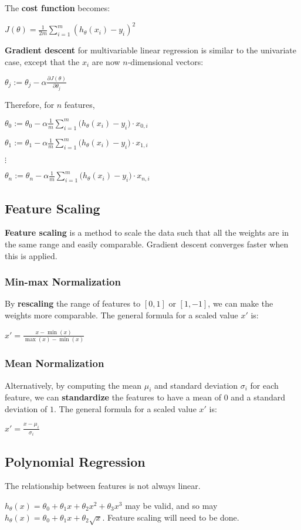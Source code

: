         The \textbf{cost function} becomes:

        $J(\theta) = \frac{1}{2m} \sum_{i=1}^m (h_\theta(x_i) - y_i)^2$

        \textbf{Gradient descent} for multivariable linear regression is similar to the univariate case, except that the $x_i$ are now $n$-dimensional vectors:

        $\theta_j := \theta_j - \alpha \frac{\partial J(\theta)}{\partial \theta_j}$

        Therefore, for $n$ features,

        $\theta_0 := \theta_0 - \alpha \frac{1}{m} \sum_{i=1}^m \big( h_\theta(x_i) - y_i \big) \cdot x_{0,i}$

        $\theta_1 := \theta_1 - \alpha \frac{1}{m} \sum_{i=1}^m \big( h_\theta(x_i) - y_i \big) \cdot x_{1,i}$

        $\vdots$

        $\theta_n := \theta_n - \alpha \frac{1}{m} \sum_{i=1}^m \big( h_\theta(x_i) - y_i \big) \cdot x_{n,i}$

    \subsection{Feature Scaling}
        \textbf{Feature scaling} is a method to scale the data such that all the weights are in the same range and easily comparable. Gradient descent converges faster when this is applied.

        \subsubsection{Min-max Normalization}
            By \textbf{rescaling} the range of features to $[0, 1]$ or $[1, -1]$, we can make the weights more comparable. The general formula for a scaled value $x'$ is:

            $x' = \frac{x - \min(x)}{\max(x) - \min(x)}$

        \subsubsection{Mean Normalization}
            Alternatively, by computing the mean $\mu_i$ and standard deviation $\sigma_i$ for each feature, we can \textbf{standardize} the features to have a mean of $0$ and a standard deviation of $1$.
            The general formula for a scaled value $x'$ is:

            $x' = \frac{x - \mu_i}{\sigma_i}$

    \subsection{Polynomial Regression}
        The relationship between features is not always linear.

        $h_\theta(x) = \theta_0 + \theta_1 x + \theta_2 x^2 + \theta_3 x^3$ may be valid, and so may $h_\theta(x) = \theta_0 + \theta_1 x + \theta_2 \sqrt{x}$. Feature scaling will need to be done.

